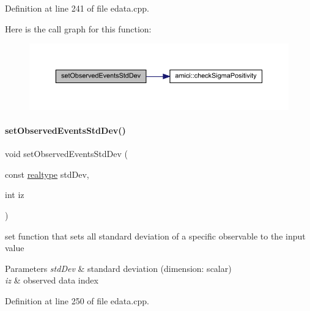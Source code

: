Definition at line 241 of file edata.\+cpp.

Here is the call graph for this function\+:
\nopagebreak
\begin{figure}[H]
\begin{center}
\leavevmode
\includegraphics[width=350pt]{classamici_1_1_exp_data_a9fe1de066fcba20ce994d9817442a826_cgraph}
\end{center}
\end{figure}
\mbox{\label{classamici_1_1_exp_data_a2533798d195c8ede07c783800adf1d82}} 
\paragraph{\texorpdfstring{setObservedEventsStdDev()}{setObservedEventsStdDev()}\hspace{0.1cm}{\footnotesize\ttfamily [4/4]}}
{\footnotesize\ttfamily void set\+Observed\+Events\+Std\+Dev (\begin{DoxyParamCaption}\item[{const \mbox{\hyperlink{namespaceamici_a1bdce28051d6a53868f7ccbf5f2c14a3}{realtype}}}]{std\+Dev,  }\item[{int}]{iz }\end{DoxyParamCaption})}

set function that sets all standard deviation of a specific observable to the input value


\begin{DoxyParams}{Parameters}
{\em std\+Dev} & standard deviation (dimension\+: scalar) \\
\hline
{\em iz} & observed data index \\
\hline
\end{DoxyParams}


Definition at line 250 of file edata.\+cpp.

